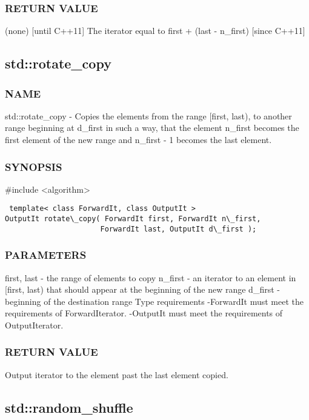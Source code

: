 \subsubsection{RETURN VALUE}
(none)
 [until C++11]
The iterator equal to first + (last - n\_first)
 [since C++11]


\subsection{std::rotate\_copy}

\subsubsection{NAME}
std::rotate\_copy - Copies the elements from the range [first, last), to another range beginning at d\_first in such a way, that the element n\_first becomes the first element of the new range and n\_first - 1 becomes the last element.

\subsubsection{SYNOPSIS}
\#include <algorithm>

\begin{lstlisting}
 template< class ForwardIt, class OutputIt >
OutputIt rotate\_copy( ForwardIt first, ForwardIt n\_first,
                      ForwardIt last, OutputIt d\_first );
\end{lstlisting}

\subsubsection{PARAMETERS}
first, last - the range of elements to copy
n\_first - an iterator to an element in [first, last) that should appear at the beginning of the new range
d\_first - beginning of the destination range
 Type requirements
 -ForwardIt must meet the requirements of ForwardIterator.
 -OutputIt must meet the requirements of OutputIterator.

\subsubsection{RETURN VALUE}
Output iterator to the element past the last element copied.



\subsection{std::random\_shuffle}

